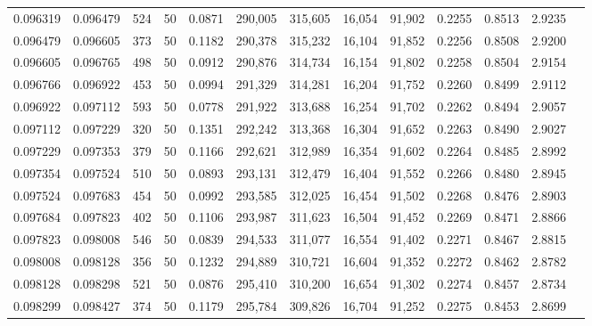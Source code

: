\begin{tabular}{rrrrrrrrrrrrr}
0.096319 & 0.096479 &   524 &  50 &                                     0.0871 & 290,005 & 315,605 &  16,054 &  91,902 & 0.2255 & 0.8513 & 2.9235 \\
0.096479 & 0.096605 &   373 &  50 &                                     0.1182 & 290,378 & 315,232 &  16,104 &  91,852 & 0.2256 & 0.8508 & 2.9200 \\
0.096605 & 0.096765 &   498 &  50 &                                     0.0912 & 290,876 & 314,734 &  16,154 &  91,802 & 0.2258 & 0.8504 & 2.9154 \\
0.096766 & 0.096922 &   453 &  50 &                                     0.0994 & 291,329 & 314,281 &  16,204 &  91,752 & 0.2260 & 0.8499 & 2.9112 \\
0.096922 & 0.097112 &   593 &  50 &                                     0.0778 & 291,922 & 313,688 &  16,254 &  91,702 & 0.2262 & 0.8494 & 2.9057 \\
0.097112 & 0.097229 &   320 &  50 &                                     0.1351 & 292,242 & 313,368 &  16,304 &  91,652 & 0.2263 & 0.8490 & 2.9027 \\
0.097229 & 0.097353 &   379 &  50 &                                     0.1166 & 292,621 & 312,989 &  16,354 &  91,602 & 0.2264 & 0.8485 & 2.8992 \\
0.097354 & 0.097524 &   510 &  50 &                                     0.0893 & 293,131 & 312,479 &  16,404 &  91,552 & 0.2266 & 0.8480 & 2.8945 \\
0.097524 & 0.097683 &   454 &  50 &                                     0.0992 & 293,585 & 312,025 &  16,454 &  91,502 & 0.2268 & 0.8476 & 2.8903 \\
0.097684 & 0.097823 &   402 &  50 &                                     0.1106 & 293,987 & 311,623 &  16,504 &  91,452 & 0.2269 & 0.8471 & 2.8866 \\
0.097823 & 0.098008 &   546 &  50 &                                     0.0839 & 294,533 & 311,077 &  16,554 &  91,402 & 0.2271 & 0.8467 & 2.8815 \\
0.098008 & 0.098128 &   356 &  50 &                                     0.1232 & 294,889 & 310,721 &  16,604 &  91,352 & 0.2272 & 0.8462 & 2.8782 \\
0.098128 & 0.098298 &   521 &  50 &                                     0.0876 & 295,410 & 310,200 &  16,654 &  91,302 & 0.2274 & 0.8457 & 2.8734 \\
0.098299 & 0.098427 &   374 &  50 &                                     0.1179 & 295,784 & 309,826 &  16,704 &  91,252 & 0.2275 & 0.8453 & 2.8699 \\

\end{tabular}

